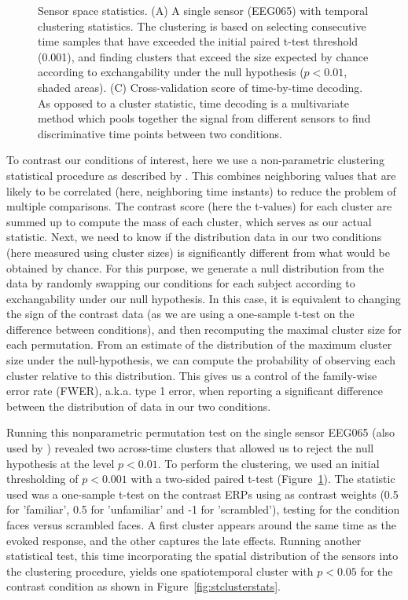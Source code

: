 \begin{figure}
    \caption{Sensor space statistics. (A) A single sensor (EEG065) with temporal clustering statistics. The clustering is based on selecting consecutive time samples that have exceeded the initial paired t-test threshold (0.001), and finding clusters that exceed the size expected by chance according to exchangability under the null hypothesis ($p < 0.01$, shaded areas). (C) Cross-validation score of time-by-time decoding. As opposed to a cluster statistic, time decoding is a multivariate method which pools together the signal from different sensors to find discriminative time points between two conditions.}
\label{fig:fig_sensorstat}
\end{figure}

To contrast our conditions of interest, here we use a non-parametric clustering statistical procedure as described by \cite{maris_nonparametric_2007}. This combines neighboring values that are likely to be correlated (here, neighboring time instants) to reduce the problem of multiple comparisons. The contrast score (here the  t-values) for each cluster are summed up to compute the mass of each cluster, which serves as our actual statistic. Next, we need to know if the distribution data in our two conditions (here measured using cluster sizes) is significantly different from what would be obtained by chance. For this purpose, we generate a null distribution from the data by randomly swapping our conditions for each subject according to exchangability under our null hypothesis. In this case, it is equivalent to changing the sign of the contrast data (as we are using a one-sample t-test on the difference between conditions), and then recomputing the maximal cluster size for each permutation. From an estimate of the distribution of the maximum cluster size under the null-hypothesis, we can compute the probability of observing each cluster relative to this distribution. This gives us a control of the family-wise error rate (FWER), a.k.a. type 1 error, when reporting a significant difference between the distribution of data in our two conditions.

Running this nonparametric permutation test on the single sensor EEG065 (also used by \cite{wakeman2015multi}) revealed two across-time clusters that allowed us to reject the null hypothesis at the level $p < 0.01$. To perform the clustering, we used an initial thresholding of $p < 0.001$ with a two-sided paired t-test (Figure~\ref{fig:fig_sensorstat}). The statistic used was a one-sample t-test on the contrast ERPs using as contrast weights (0.5 for 'familiar', 0.5 for 'unfamiliar' and -1 for 'scrambled'), testing for the condition faces versus scrambled faces. A first cluster appears around the same time as the evoked response, and the other captures the late effects. Running another statistical test, this time incorporating the spatial distribution of the sensors into the clustering procedure, yields one spatiotemporal cluster with $p < 0.05$ for the contrast condition as shown in Figure~\ref{fig:stclusterstats}.

